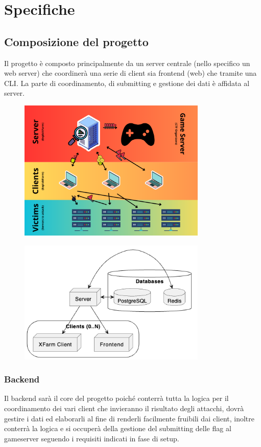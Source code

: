 \documentclass[11pt]{article}
\begin{document}
\section{Specifiche}
\subsection{Composizione del progetto}
Il progetto è composto principalmente da un server centrale (nello specifico un web server) che coordinerà una serie di client sia frontend (web) che tramite una CLI. La parte di coordinamento, di submitting e gestione dei dati è affidata al server.
    \begin{figure}[H]
    	\centering
    	\includegraphics[width=0.8\textwidth]{general_layout.png}
	\end{figure}
	\begin{figure}[H]
    	\centering
    	\includegraphics[width=0.8\textwidth]{Architecture.png}
	\end{figure}\subsubsection{Backend}
Il backend sarà il core del progetto poiché conterrà tutta la logica per il coordinamento dei vari client che invieranno il risultato degli attacchi, dovrà gestire i dati ed elaborarli al fine di renderli facilmente fruibili dai client, inoltre conterrà la logica e si occuperà della gestione del submitting delle flag al gameserver seguendo i requisiti indicati in fase di setup.
\end{document}
